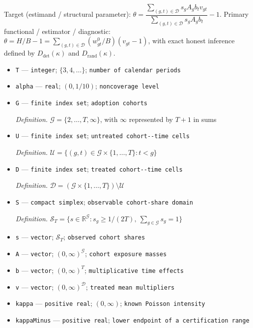 \documentclass{article}
\begin{document}
Target (estimand / structural parameter): \(\theta=\dfrac{\sum_{(g,t)\in\mathcal D}s_gA_gb_tv_{gt}}{\sum_{(g,t)\in\mathcal D}s_gA_gb_t}-1\).
Primary functional / estimator / diagnostic: \(\theta=H/B-1=\sum_{(g,t)\in\mathcal D}(w^0_{gt}/B)(v_{gt}-1)\), with exact honest inference defined by \(D_{\mathrm{det}}(\kappa)\) and \(D_{\mathrm{rand}}(\kappa)\).
\begin{itemize}
  \item \texttt{T} --- \texttt{integer}; \(\{3,4,\ldots\}\); \texttt{number of calendar periods}
  \item \texttt{alpha} --- \texttt{real}; \((0,1/10)\); \texttt{noncoverage level}
  \item \texttt{G} --- \texttt{finite index set}; \texttt{adoption cohorts}
  \par\smallskip\noindent\emph{Definition.} \(\mathcal G=\{2,\ldots,T,\infty\}\), with \(\infty\) represented by \(T+1\) in sums
  \item \texttt{U} --- \texttt{finite index set}; \texttt{untreated cohort-\allowbreak{}-\allowbreak{}time cells}
  \par\smallskip\noindent\emph{Definition.} \(\mathcal U=\{(g,t)\in\mathcal G\times\{1,\ldots,T\}:t<g\}\)
  \item \texttt{D} --- \texttt{finite index set}; \texttt{treated cohort-\allowbreak{}-\allowbreak{}time cells}
  \par\smallskip\noindent\emph{Definition.} \(\mathcal D=(\mathcal G\times\{1,\ldots,T\})\setminus\mathcal U\)
  \item \texttt{S} --- \texttt{compact simplex}; \texttt{observable cohort-\allowbreak{}share domain}
  \par\smallskip\noindent\emph{Definition.} \(\mathcal S_T=\{s\in\mathbb R^{\mathcal G}:s_g\ge 1/(2T),\ \sum_{g\in\mathcal G}s_g=1\}\)
  \item \texttt{s} --- \texttt{vector}; \(\mathcal S_T\); \texttt{observed cohort shares}
  \item \texttt{A} --- \texttt{vector}; \((0,\infty)^{\mathcal G}\); \texttt{cohort exposure masses}
  \item \texttt{b} --- \texttt{vector}; \((0,\infty)^T\); \texttt{multiplicative time effects}
  \item \texttt{v} --- \texttt{vector}; \((0,\infty)^{\mathcal D}\); \texttt{treated mean multipliers}
  \item \texttt{kappa} --- \texttt{positive real}; \((0,\infty)\); \texttt{known Poisson intensity}
  \item \texttt{kappaMinus} --- \texttt{positive real}; \texttt{lower endpoint of a certification range}

\end{itemize}
\end{document}
